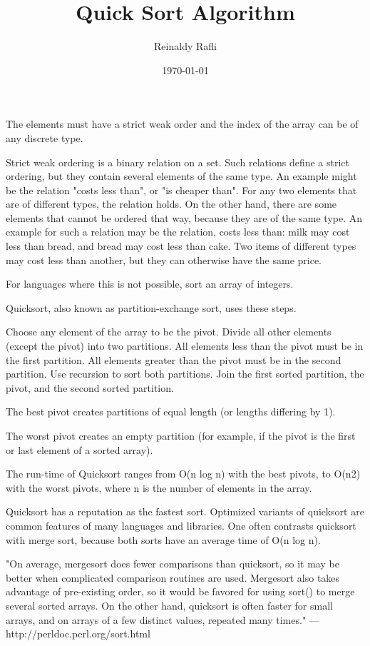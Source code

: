\documentclass{article}
\author{Reinaldy Rafli}
\date{\today}
\title{Quick Sort Algorithm}
\begin{document}
\maketitle

The elements must have a strict weak order and the index of the array can be of any discrete type.

Strict weak ordering is a binary relation on a set. Such relations define a strict ordering, but they contain
several elements of the same type. An example might be the relation "costs less than", or "is cheaper than".
For any two elements that are of different types, the relation holds. On the other hand, there are some elements
that cannot be ordered that way, because they are of the same type. An example for such a relation may be the relation,
costs less than: milk may cost less than bread, and bread may cost less than cake. Two items of different types may cost
less than another, but they can otherwise have the same price.

For languages where this is not possible, sort an array of integers.


Quicksort, also known as partition-exchange sort, uses these steps.

  Choose any element of the array to be the pivot.
  Divide all other elements (except the pivot) into two partitions.
  All elements less than the pivot must be in the first partition.
  All elements greater than the pivot must be in the second partition.
  Use recursion to sort both partitions.
  Join the first sorted partition, the pivot, and the second sorted partition.

The best pivot creates partitions of equal length (or lengths differing by   1).

The worst pivot creates an empty partition (for example, if the pivot is the first or last element of a sorted array).

The run-time of Quicksort ranges from O(n log n) with the best pivots, to O(n2) with the worst pivots, 
where n is the number of elements in the array.

Quicksort has a reputation as the fastest sort. Optimized variants of quicksort are common features of many languages
and libraries. One often contrasts quicksort with merge sort, because both sorts have an average time of O(n log n).

"On average, mergesort does fewer comparisons than quicksort, so it may be better when complicated comparison routines
are used. Mergesort also takes advantage of pre-existing order, so it would be favored for using sort() to merge several
sorted arrays. On the other hand, quicksort is often faster for small arrays, and on arrays of a few distinct values, 
repeated many times." — http://perldoc.perl.org/sort.html
\end{document}
